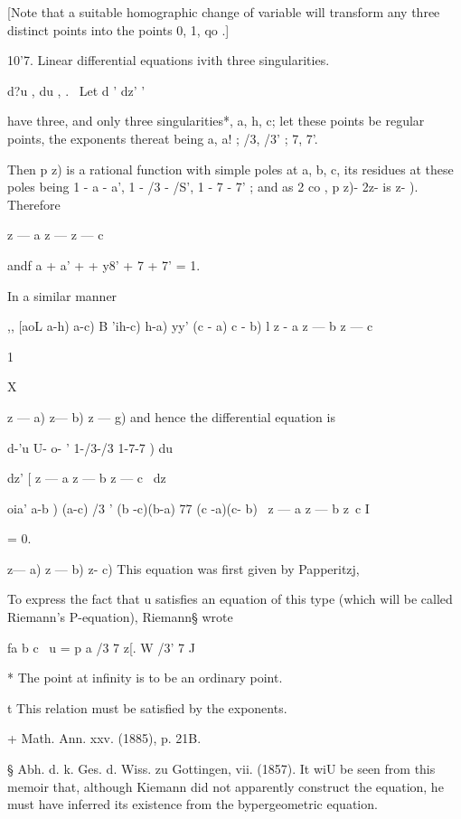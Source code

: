 [Note that a suitable homographic change of variable will transform
any three distinct points into the points 0, 1, qo .]

10'7. Linear differential equations ivith three singularities.

d?u , du , . \ Let d ' dz' '

have three, and only three singularities*, a, h, c; let these points
be regular points, the exponents thereat being a, a! ; /3, /3' ; 7,
7'.

Then p z) is a rational function with simple poles at a, b, c, its
residues at these poles being 1 - a - a', 1 - /3 - /S', 1 - 7 - 7' ;
and as 2 co , p z)- 2z- is z- ). Therefore

  z — a z — z — c

andf a + a' + + y8' + 7 + 7' = 1.

In a similar manner

,, [aoL a-h) a-c) B 'ih-c) h-a) yy' (c - a) c - b) l z - a z — b z — c

1

X



 z — a) z— b) z — g) and hence the differential equation is

d-'u U- o- ' 1-/3-/3 1-7-7 ) du



dz' [ z — a z — b z — c \ dz

  oia' a-b ) (a-c) /3 ' (b -c)(b-a) 77 (c -a)(c- b) \ z — a z — b z~c
I



= 0.



 z— a) z — b) z- c) This equation was first given by Papperitzj,

To express the fact that u satisfies an equation of this type (which
will be called Riemann's P-equation), Riemann§ wrote

fa b c \ u = p a /3 7 z[. W /3' 7 J

* The point at infinity is to be an ordinary point.

t This relation must be satisfied by the exponents.

+ Math. Ann. xxv. (1885), p. 21B.

§ Abh. d. k. Ges. d. Wiss. zu Gottingen, vii. (1857). It wiU be seen
from this memoir that, although Kiemann did not apparently construct
the equation, he must have inferred its existence from the
bypergeometric equation.



